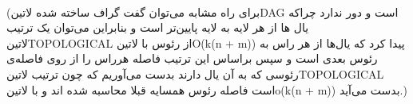 {\\(برای راه مشابه می‌توان گفت گراف ساخته شده ‌لاتین{DAG} است و دور ندارد چراکه یال ها از هر لایه به لایه پایین‌تر است و بنابراین می‌توان یک ترتیب ‌لاتین{TOPOLOGICAL} از رئوس با ‌لاتین{O(k(n + m))} پیدا کرد که یال‌ها از هر راس به رئوس بعدی است و سپس براساس این ترتیب فاصله هرراس را از روی فاصله‌ی رئوسی که به آن یال دارند بدست می‌آوریم که چون ترتیب ‌لاتین{TOPOLOGICAL} است فاصله رئوس همسایه قبلا محاسبه شده اند و با ‌لاتین{o(k(n + m))} بدست می‌آید.)
\\
}











